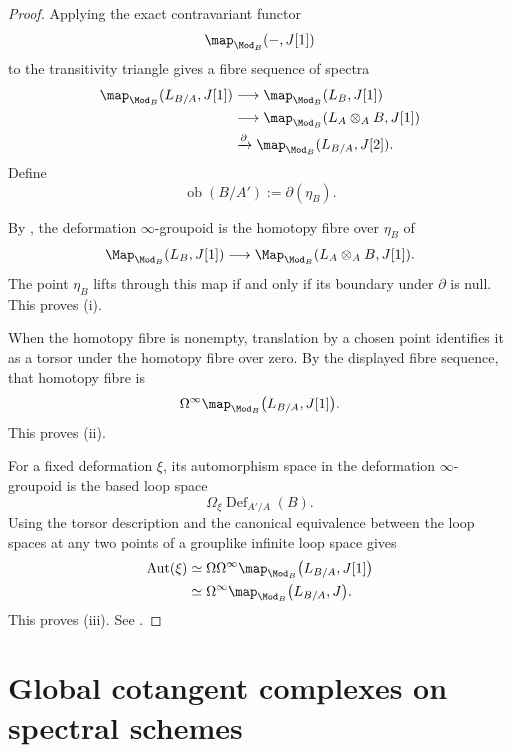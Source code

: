 \begin{proof}
Applying the exact contravariant functor
\[
    \map_{\Mod_B}(-,J[1])
\]
to the transitivity triangle gives a fibre sequence of spectra
\[
\begin{aligned}
    \map_{\Mod_B}(L_{B/A},J[1])
    &\longrightarrow
    \map_{\Mod_B}(L_B,J[1])
    \\
    &\longrightarrow
    \map_{\Mod_B}(L_A\otimes_AB,J[1])
    \\
    &\xrightarrow{\partial}
    \map_{\Mod_B}(L_{B/A},J[2]).
\end{aligned}
\]
Define
\[
    \operatorname{ob}(B/A')
    :=
    \partial(\eta_B).
\]

By
,
the deformation $\infty$-groupoid is the homotopy fibre over $\eta_B$
of
\[
    \Map_{\Mod_B}(L_B,J[1])
    \longrightarrow
    \Map_{\Mod_B}(L_A\otimes_AB,J[1]).
\]
The point $\eta_B$ lifts through this map if and only if its boundary
under $\partial$ is null. This proves \textup{(i)}.

When the homotopy fibre is nonempty, translation by a chosen point
identifies it as a torsor under the homotopy fibre over zero. By the
displayed fibre sequence, that homotopy fibre is
\[
    \Omega^\infty
    \map_{\Mod_B}
    \bigl(
        L_{B/A},
        J[1]
    \bigr).
\]
This proves \textup{(ii)}.

For a fixed deformation $\xi$, its automorphism space in the deformation
$\infty$-groupoid is the based loop space
\[
    \Omega_\xi
    \operatorname{Def}_{A'/A}(B).
\]
Using the torsor description and the canonical equivalence between the
loop spaces at any two points of a grouplike infinite loop space gives
\[
\begin{aligned}
    \operatorname{Aut}(\xi)
    &\simeq
    \Omega
    \Omega^\infty
    \map_{\Mod_B}
    \bigl(
        L_{B/A},
        J[1]
    \bigr)
    \\
    &\simeq
    \Omega^\infty
    \map_{\Mod_B}
    \bigl(
        L_{B/A},
        J
    \bigr).
\end{aligned}
\]
This proves \textup{(iii)}. See
\cite[Remark~3.23]{LurieDAGIV}.
\end{proof}

\section{Global cotangent complexes on spectral schemes}
\label{sec:global-cotangent-spectral-schemes}

